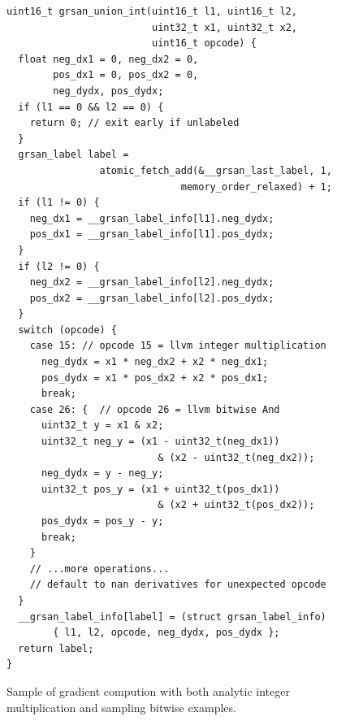 

\begin{figure}
\begin{lstlisting}
uint16_t grsan_union_int(uint16_t l1, uint16_t l2, 
                         uint32_t x1, uint32_t x2, 
                         uint16_t opcode) { 
  float neg_dx1 = 0, neg_dx2 = 0, 
        pos_dx1 = 0, pos_dx2 = 0, 
        neg_dydx, pos_dydx; 
  if (l1 == 0 && l2 == 0) { 
    return 0; // exit early if unlabeled
  } 
  grsan_label label = 
                atomic_fetch_add(&__grsan_last_label, 1, 
                              memory_order_relaxed) + 1; 
  if (l1 != 0) { 
    neg_dx1 = __grsan_label_info[l1].neg_dydx;
    pos_dx1 = __grsan_label_info[l1].pos_dydx;
  }
  if (l2 != 0) {
    neg_dx2 = __grsan_label_info[l2].neg_dydx;
    pos_dx2 = __grsan_label_info[l2].pos_dydx;
  }
  switch (opcode) { 
    case 15: // opcode 15 = llvm integer multiplication
      neg_dydx = x1 * neg_dx2 + x2 * neg_dx1;
      pos_dydx = x1 * pos_dx2 + x2 * pos_dx1;
      break;
    case 26: {  // opcode 26 = llvm bitwise And
      uint32_t y = x1 & x2;
      uint32_t neg_y = (x1 - uint32_t(neg_dx1)) 
                          & (x2 - uint32_t(neg_dx2));
      neg_dydx = y - neg_y;
      uint32_t pos_y = (x1 + uint32_t(pos_dx1)) 
                          & (x2 + uint32_t(pos_dx2));
      pos_dydx = pos_y - y;
      break;
    }
    // ...more operations...
    // default to nan derivatives for unexpected opcode
  }
  __grsan_label_info[label] = (struct grsan_label_info) 
        { l1, l2, opcode, neg_dydx, pos_dydx };
  return label;
}
\end{lstlisting}
  \caption{\label{fig:binop_code}Sample of gradient compution with both analytic integer multiplication and sampling bitwise  examples.}
\end{figure}




